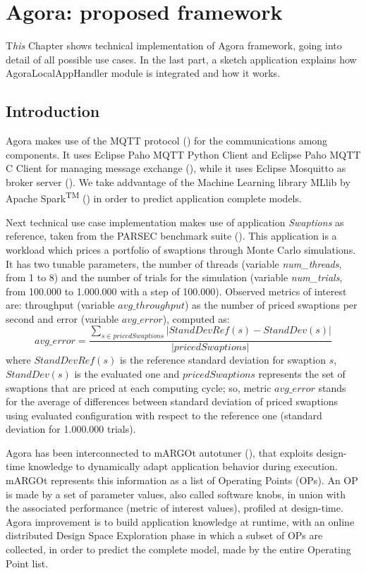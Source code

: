 \chapter{Agora: proposed framework}\label{agora}

\lettrine{T}{}\textit{his} Chapter shows technical implementation of Agora framework, going into detail of all possible use cases. In the last part, a sketch application explains how AgoraLocalAppHandler module is integrated and how it works.


\section{Introduction}

Agora makes use of the MQTT protocol (\cite{banks2014mqtt}) for the communications among components. It uses Eclipse Paho MQTT Python Client and Eclipse Paho MQTT C Client for managing message exchange (\cite{o2014paho}), while it uses Eclipse Mos\-quitto as broker server (\cite{light2013mosquitto}). We take addvantage of the Machine Learning library MLlib by Apache Spark\textsuperscript{TM} (\cite{spark2015apache}) in order to predict application complete models.

Next technical use case implementation makes use of application \textit{Swaptions} as reference, taken from the PARSEC benchmark suite (\cite{bienia2008parsec}). This application is a workload which prices a portfolio of swaptions through Monte Carlo simulations. It has two tunable parameters, the number of threads (variable \textit{num\_threads}, from 1 to 8) and the number of trials for the simulation (variable \textit{num\_trials}, from 100.000 to 1.000.000 with a step of 100.000). Observed metrics of interest are: throughput (variable $avg\_throughput$) as the number of priced swaptions per second and error (variable $avg\_error$), computed as:
\[
avg\_error = \dfrac{\sum_{s \in pricedSwaptions} \left\vert StandDevRef(s) - StandDev(s) \right\vert}{\left\vert pricedSwaptions \right\vert}
\]
where $StandDevRef(s)$ is the reference standard deviation for swaption $s$, $StandDev(s)$ is the evaluated one and $pricedSwaptions$ represents the set of swaptions that are priced at each computing cycle; so, metric $avg\_error$ stands for the average of differences between standard deviation of priced swaptions using evaluated configuration with respect to the reference one (standard deviation for 1.000.000 trials).

Agora has been interconnected to mARGOt autotuner (\cite{gadioli2015application}), that exploits design-time knowledge to dynamically adapt application behavior during execution. mARGOt represents this information as a list of Operating Points (OPs). An OP is made by a set of parameter values, also called software knobs, in union with the associated performance (metric of interest values), profiled at design-time. Agora improvement is to build application knowledge at runtime, with an online distributed Design Space Exploration phase in which a subset of OPs are collected, in order to predict the complete model, made by the entire Operating Point list.

